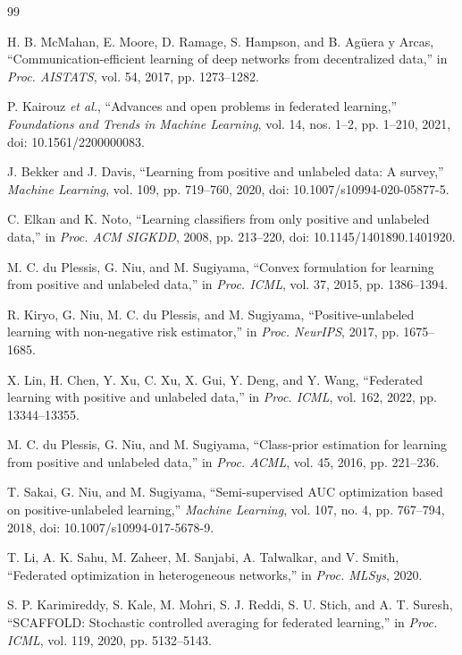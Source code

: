 \documentclass[lettersize,journal]{IEEEtran}
\begin{document}
\begin{thebibliography}{99}

H. B. McMahan, E. Moore, D. Ramage, S. Hampson, and B. Ag\"uera y Arcas, ``Communication-efficient learning of deep networks from decentralized data,'' in \emph{Proc. AISTATS}, vol. 54, 2017, pp. 1273--1282.

P. Kairouz \emph{et al.}, ``Advances and open problems in federated learning,'' \emph{Foundations and Trends in Machine Learning}, vol. 14, nos. 1--2, pp. 1--210, 2021, doi: 10.1561/2200000083.

J. Bekker and J. Davis, ``Learning from positive and unlabeled data: A survey,'' \emph{Machine Learning}, vol. 109, pp. 719--760, 2020, doi: 10.1007/s10994-020-05877-5.

C. Elkan and K. Noto, ``Learning classifiers from only positive and unlabeled data,'' in \emph{Proc. ACM SIGKDD}, 2008, pp. 213--220, doi: 10.1145/1401890.1401920.

M. C. du Plessis, G. Niu, and M. Sugiyama, ``Convex formulation for learning from positive and unlabeled data,'' in \emph{Proc. ICML}, vol. 37, 2015, pp. 1386--1394.

R. Kiryo, G. Niu, M. C. du Plessis, and M. Sugiyama, ``Positive-unlabeled learning with non-negative risk estimator,'' in \emph{Proc. NeurIPS}, 2017, pp. 1675--1685.

X. Lin, H. Chen, Y. Xu, C. Xu, X. Gui, Y. Deng, and Y. Wang, ``Federated learning with positive and unlabeled data,'' in \emph{Proc. ICML}, vol. 162, 2022, pp. 13344--13355.

M. C. du Plessis, G. Niu, and M. Sugiyama, ``Class-prior estimation for learning from positive and unlabeled data,'' in \emph{Proc. ACML}, vol. 45, 2016, pp. 221--236.

T. Sakai, G. Niu, and M. Sugiyama, ``Semi-supervised AUC optimization based on positive-unlabeled learning,'' \emph{Machine Learning}, vol. 107, no. 4, pp. 767--794, 2018, doi: 10.1007/s10994-017-5678-9.

T. Li, A. K. Sahu, M. Zaheer, M. Sanjabi, A. Talwalkar, and V. Smith, ``Federated optimization in heterogeneous networks,'' in \emph{Proc. MLSys}, 2020.

S. P. Karimireddy, S. Kale, M. Mohri, S. J. Reddi, S. U. Stich, and A. T. Suresh, ``SCAFFOLD: Stochastic controlled averaging for federated learning,'' in \emph{Proc. ICML}, vol. 119, 2020, pp. 5132--5143.


\end{thebibliography}
\end{document}
